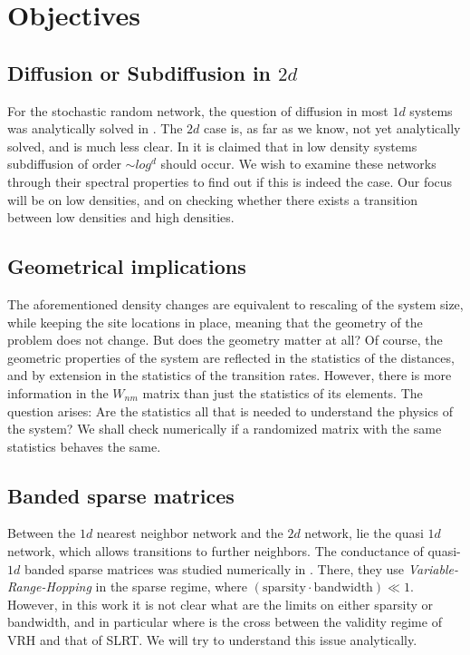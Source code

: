 \chapter{Objectives}



\section{Diffusion or Subdiffusion in $2d$}

For the stochastic random network, the question of diffusion in most $1d$ systems was analytically solved in \cite{alexander_excitation_1981}. 
The $2d$ case is, as far as we know, not yet analytically solved, and is much less clear. 
In \cite{amir_localization_2010} it is claimed that in low density systems subdiffusion of
order $\sim log^d$ should occur. We wish to examine these networks through their spectral
properties to find out if this is indeed the case. Our focus will be on low densities,
and on checking whether there exists a transition between low densities and high densities.


\section{Geometrical implications}

The aforementioned density changes are equivalent to rescaling of the system size,
while keeping the site locations in place, meaning that the geometry of the problem 
does not change. But does the geometry matter at all? Of course, the geometric properties
of the system are reflected in the statistics of the distances,
and by extension in the statistics of the transition rates. 
However, there is more information in the $W_{nm}$ matrix than just the statistics of its elements.
The question arises: Are the statistics all that is needed to understand the physics of the system? 
We shall check numerically if a randomized matrix with the same statistics behaves the same.



\section{Banded sparse matrices}

Between the $1d$ nearest neighbor network and the $2d$ network,
lie the quasi $1d$ network, which allows transitions to further neighbors.
The conductance of quasi-$1d$ banded sparse matrices was studied numerically in \cite{stotland_random-matrix_2010}. There, they use \emph{Variable-Range-Hopping} in the sparse regime, where 
$(\text{sparsity}\cdot \text{bandwidth}) \ll 1$. 
However, in this work it is not clear what are the limits on either sparsity or bandwidth, and in particular where is the cross between the validity regime of VRH and that of SLRT. We will try to understand this issue analytically.


